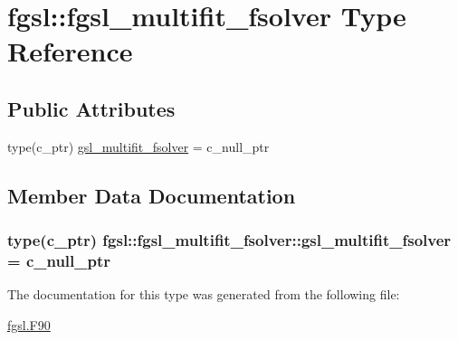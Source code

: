\hypertarget{structfgsl_1_1fgsl__multifit__fsolver}{\section{fgsl\-:\-:fgsl\-\_\-multifit\-\_\-fsolver Type Reference}
\label{structfgsl_1_1fgsl__multifit__fsolver}
}
\subsection*{Public Attributes}
\begin{DoxyCompactItemize}
\item 
type(c\-\_\-ptr) \hyperlink{structfgsl_1_1fgsl__multifit__fsolver_a4b7f26c5f38dd0b891c32f84d077ac37}{gsl\-\_\-multifit\-\_\-fsolver} = c\-\_\-null\-\_\-ptr
\end{DoxyCompactItemize}


\subsection{Member Data Documentation}
\hypertarget{structfgsl_1_1fgsl__multifit__fsolver_a4b7f26c5f38dd0b891c32f84d077ac37}{
\subsubsection[{gsl\-\_\-multifit\-\_\-fsolver}]{\setlength{\rightskip}{0pt plus 5cm}type(c\-\_\-ptr) fgsl\-::fgsl\-\_\-multifit\-\_\-fsolver\-::gsl\-\_\-multifit\-\_\-fsolver = c\-\_\-null\-\_\-ptr}}\label{structfgsl_1_1fgsl__multifit__fsolver_a4b7f26c5f38dd0b891c32f84d077ac37}


The documentation for this type was generated from the following file\-:\begin{DoxyCompactItemize}
\item 
\hyperlink{fgsl_8F90}{fgsl.\-F90}\end{DoxyCompactItemize}
